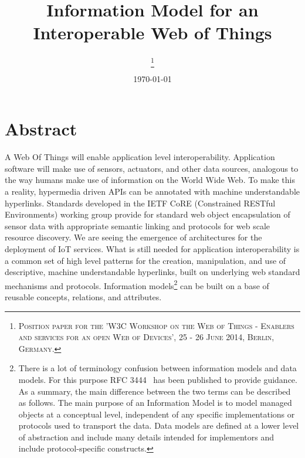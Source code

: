 \documentclass[journal]{IEEEtran}
\begin{document}
\title{Information Model for an \\Interoperable Web of Things}

\author{
\thanks{\textsc{
Position paper for the 'W3C Workshop on the Web of Things - Enablers and services for an open Web of Devices', 
25 - 26 June 2014, Berlin, Germany.}}
}

\date{\today}

\maketitle

\section{Abstract}

A Web Of Things will enable application level interoperability. Application software will make use of sensors, actuators, and other data sources, analogous to the way humans make use of information on the World Wide Web. To make this a reality, hypermedia driven APIs can be annotated with machine understandable hyperlinks. Standards developed in the IETF CoRE (Constrained RESTful Environments) working group provide for standard web object encapsulation of sensor data with appropriate semantic linking and protocols for web scale resource discovery. We are seeing the emergence of architectures for the deployment of IoT services. What is still needed for application interoperability is a common set of high level patterns for the creation, manipulation, and use of descriptive, machine understandable hyperlinks, built on underlying web standard mechanisms and protocols. Information models\footnote{There is a lot of terminology confusion between information models and data models. For this purpose RFC 3444~\cite{RFC3444} has been published to provide guidance. As a summary, the main difference between the two terms can be described as follows. The main purpose of an Information Model is to model managed objects at a conceptual level, independent of any specific implementations or protocols used to transport the data. Data models are defined at a lower level of abstraction and include many details intended for implementors and include protocol-specific constructs.} can be built on a base of reusable concepts, relations, and attributes. 
\end{document}
